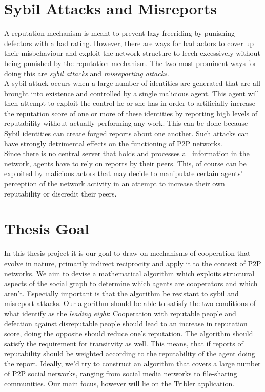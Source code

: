 \documentclass[11pt,a4paper]{article}
\theoremstyle{definition}
\theoremstyle{theorem}
\begin{document}
\section{Sybil Attacks and Misreports}
\label{sec:Sybil Attacks and Misreports}
A reputation mechanism is meant to prevent lazy freeriding by punishing defectors with a bad rating. However, there are ways for bad actors to cover up their misbehaviour and exploit the network structure to leech excessively without being punished by the reputation mechanism. The two most prominent ways for doing this are {\it sybil attacks} and {\it misreporting attacks}. \vspace{1em}\\

\noindent{}A sybil attack occurs when a large number of identities are generated that are all brought into existence and controlled by a single malicious agent. This agent will then attempt to exploit the control he or she has in order to artificially increase the reputation score of one or more of these identities by reporting high levels of reputability without actually performing any work. This can be done because Sybil identities can create forged reports about one another. Such attacks can have strongly detrimental effects on the functioning of P2P networks. \vspace{1em}\\

\noindent{}Since there is no central server that holds and processes all information in the network, agents have to rely on reports by their peers. This, of course can be exploited by malicious actors that may decide to manipulate certain agents' perception of the network activity in an attempt to increase their own reputability or discredit their peers.  

\section{Thesis Goal}
\label{sec:Thesis Goal}
In this thesis project it is our goal to draw on mechanisms of cooperation that evolve in nature, primarily indirect reciprocity and apply it to the context of P2P networks. We aim to devise a mathematical algorithm which exploits structural aspects of the social graph to determine which agents are cooperators and which aren't. Especially important is that the algorithm be resistant to sybil and misreport attacks. Our algorithm should be able to satisfy the two conditions of what \cite{How Should We Define Goodness} identify as the {\it leading eight}: Cooperation with reputable people and defection against disreputable people should lead to an increase in reputation score, doing the opposite should reduce one's reputation. The algorithm should satisfy the requirement for transitvity as well. This means, that if reports of reputability should be weighted according to the reputability of the agent doing the report. Ideally, we'd try to construct an algorithm that covers a large number of P2P social networks, ranging from social media networks to file-sharing communities. Our main focus, however will lie on the Tribler application.\vspace{1em}\\ 
\end{document}
